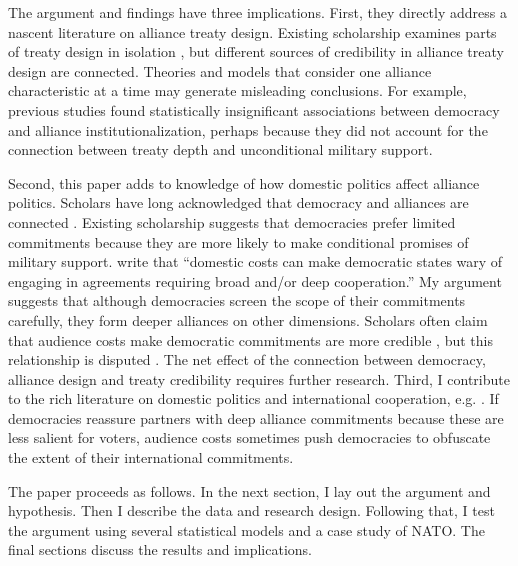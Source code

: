\documentclass[12pt]{article}
\begin{document}
The argument and findings have three implications.
First, they directly address a nascent literature on alliance treaty design.  
Existing scholarship examines parts of treaty design in isolation \citep{Benson2012, Mattes2012, Chibaetal2015}, but different sources of credibility in alliance treaty design are connected. 
Theories and models that consider one alliance characteristic at a time may generate misleading conclusions. 
For example, previous studies found statistically insignificant associations between democracy and alliance institutionalization, perhaps because they did not account for the connection between treaty depth and unconditional military support. 


Second, this paper adds to knowledge of how domestic politics affect alliance politics. 
Scholars have long acknowledged that democracy and alliances are connected \citep{LaiReiter2000, GiblerWolford2006, Mattes2012, Warren2016, McManusYarhi-Milo2017}. 
Existing scholarship suggests that democracies prefer limited commitments \citep{Mattes2012, Chibaetal2015} because they are more likely to make conditional promises of military support. 
\citet{Chibaetal2015} write that ``domestic costs can make democratic states wary of engaging in agreements requiring broad and/or deep cooperation.'' 
My argument suggests that although democracies screen the scope of their commitments carefully, they form deeper alliances on other dimensions.  
Scholars often claim that audience costs make democratic commitments are more credible \citep{Gaubatz1996, Leedsetal2009, DigiuseppePoast2016}, but this relationship is disputed \citep{GartzkeGleditsch2004, DownesSechser2012}. 
The net effect of the connection between democracy, alliance design and treaty credibility requires further research. 
Third, I contribute to the rich literature on domestic politics and international cooperation, e.g. \citep{DownesRocke1995, Fearon1998, Leeds1999, MattesRodriguez2014}. 
If democracies reassure partners with deep alliance commitments because these are less salient for voters, audience costs sometimes push democracies to obfuscate the extent of their international commitments. 


The paper proceeds as follows. 
In the next section, I lay out the argument and hypothesis. 
Then I describe the data and research design. 
Following that, I test the argument using several statistical models and a case study of NATO. 
The final sections discuss the results and implications. 
\end{document}
